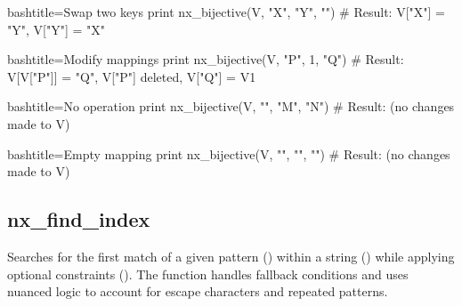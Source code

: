 \begin{NexCodeBox}{bash}{title={Swap two keys}}
    print nx_bijective(V, "X", "Y", "")
    # Result: V["X"] = "Y", V["Y"] = "X"
\end{NexCodeBox}

\begin{NexCodeBox}{bash}{title={Modify mappings}}
    print nx_bijective(V, "P", 1, "Q")
    # Result: V[V["P"]] = "Q", V["P"] deleted, V["Q"] = V1
\end{NexCodeBox}

\begin{NexCodeBox}{bash}{title={No operation}}
    print nx_bijective(V, "", "M", "N")
    # Result: (no changes made to V)
\end{NexCodeBox}

\begin{NexCodeBox}{bash}{title={Empty mapping}}
    print nx_bijective(V, "", "", "")
    # Result: (no changes made to V)
\end{NexCodeBox}

\newpage
\subsection{nx_find_index}
\label{nx_find_index}

\begin{NexMainBox}
	\begin{NexMainBox}
		Searches for the first match of a given pattern () within a string () while applying optional constraints (). The function handles fallback conditions and uses nuanced logic to account for escape characters and repeated patterns.
	\end{NexMainBox}
	\begin{NexMainBox}
		\begin{NexListDark}
		\end{NexListDark}
	\end{NexMainBox}
\end{NexMainBox}

